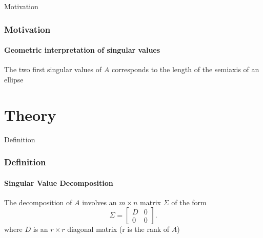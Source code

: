 \documentclass{beamer}
\begin{document}
\begin{frame}{Motivation}

\frametitle{Motivation}
\framesubtitle{Geometric interpretation of singular values}

The two first singular values of $A$ corresponds to the length of the semiaxis of an ellipse

\begin{figure}[h] 
\end{figure}  

\end{frame}

\section{Theory}

\begin{frame}{Definition}

\frametitle{Definition}
\framesubtitle{Singular Value Decomposition}
The decomposition of $A$ involves an $m \times n$ matrix $\Sigma$ of the form
\begin{equation}
\Sigma = \begin{bmatrix}D & 0 \\ 0 & 0 \end{bmatrix}.
\end{equation}
where $D$ is an $r \times r$ diagonal matrix (r is the rank of $A$)
\end{frame}
\end{document}

